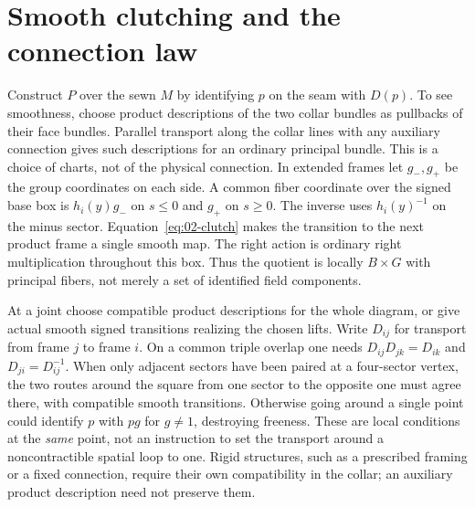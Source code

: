\section{Smooth clutching and the connection law}

Construct $P$ over the sewn $M$ by identifying $p$ on the seam with $D(p)$. To see smoothness, choose product descriptions of the two collar bundles as pullbacks of their face bundles. Parallel transport along the collar lines with any auxiliary connection gives such descriptions for an ordinary principal bundle. This is a choice of charts, not of the physical connection. In extended frames let $g_-,g_+$ be the group coordinates on each side. A common fiber coordinate over the signed base box is $h_i(y)g_-$ on $s\leq0$ and $g_+$ on $s\geq0$. The inverse uses $h_i(y)^{-1}$ on the minus sector. Equation~\eqref{eq:02-clutch} makes the transition to the next product frame a single smooth map. The right action is ordinary right multiplication throughout this box. Thus the quotient is locally $B\times G$ with principal fibers, not merely a set of identified field components.

At a joint choose compatible product descriptions for the whole diagram, or give actual smooth signed transitions realizing the chosen lifts. Write $D_{ij}$ for transport from frame $j$ to frame $i$. On a common triple overlap one needs $D_{ij}D_{jk}=D_{ik}$ and $D_{ji}=D_{ij}^{-1}$. When only adjacent sectors have been paired at a four-sector vertex, the two routes around the square from one sector to the opposite one must agree there, with compatible smooth transitions. Otherwise going around a single point could identify $p$ with $p g$ for $g\neq 1$, destroying freeness. These are local conditions at the \emph{same} point, not an instruction to set the transport around a noncontractible spatial loop to one. Rigid structures, such as a prescribed framing or a fixed connection, require their own compatibility in the collar; an auxiliary product description need not preserve them.

